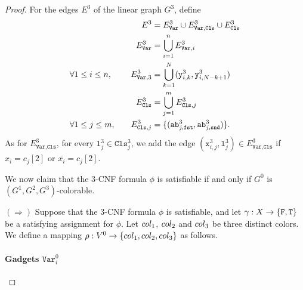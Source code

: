 \begin{proof}
    For the edges $E^{3}$ of the linear graph $G^{3}$,
    define
    \begin{alignat*}{2}
      &&
      E^{3} &= E^{3}_{\texttt{Var}} \cup E^{3}_{\texttt{Var},\texttt{Cls}} \cup E^{3}_{\texttt{Cls}}
      \\
      &&
      E^{3}_{\texttt{Var}} &= \bigcup_{i=1}^{n} E^{3}_{\texttt{Var}, i}
      \\
      &\forall 1\leq i \leq n,\quad&
      E^{3}_{\texttt{Var}, 3} &= \bigcup_{k=1}^{N} (\texttt{y}^{3}_{i,k}, \texttt{y}^{3}_{i,N-k+1})
      \\
      &&
      E^{3}_{\texttt{Cls}} &= \bigcup_{j=1}^{m} E^{3}_{\texttt{Cls}, j}
      \\
      &\forall 1\leq j \leq m,\quad&
      E^{3}_{\texttt{Cls}, j} &=
      \{
      (\texttt{ab}^{3}_{j,\texttt{fst}}, \texttt{ab}^{3}_{j,\texttt{snd}})
      \}\text{.}
    \end{alignat*}
    As for $E^{3}_{\texttt{Var},\texttt{Cls}}$,
    for every $\texttt{l}^{3}_{j} \in \texttt{Cls}^{3}_{j}$,
    we add the edge
    $(\texttt{x}^{3}_{i,j}, \texttt{l}^{3}_{j}) \in E^{3}_{\texttt{Var},\texttt{Cls}}$
    if $x_{i} = c_{j}[2]$ or $\overline{x_{i}} = c_{j}[2]$.

  \bigskip

  We now claim that the $3$-CNF formula $\phi$ is satisfiable
  if and only if
  $G^{0}$ is $(G^{1}, G^{2}, G^{3})$-colorable.

  $(\Rightarrow)$
  Suppose that the $3$-CNF formula $\phi$ is satisfiable, and
  let $\gamma : X \to \{\texttt{F}, \texttt{T}\}$ be a satisfying assignment
  for $\phi$.
  Let $col_1$, $col_2$ and $col_3$ be three distinct colors.
  We define a mapping
  $\rho : V^{0} \to \{col_1, col_2, col_3\}$ as follows.

  \paragraph*{Gadgets $\texttt{Var}^{0}_{i}$}


\end{proof}
